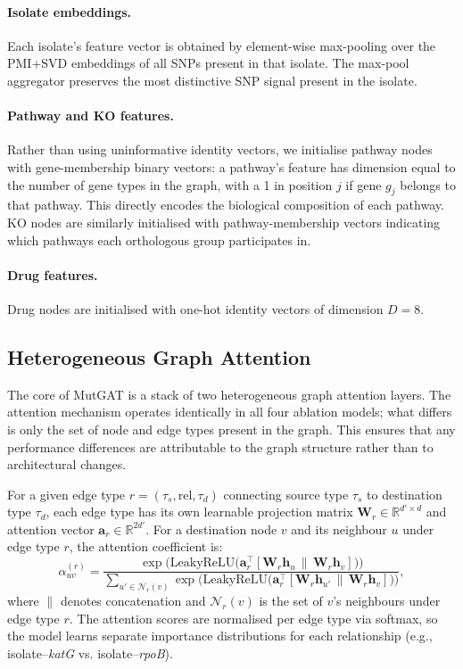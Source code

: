\documentclass{article}
\theoremstyle{plain}
\theoremstyle{definition}
\theoremstyle{remark}
\begin{document}
\paragraph{Isolate embeddings.}
Each isolate's feature vector is obtained by element-wise max-pooling over the PMI+SVD embeddings of all SNPs present in that isolate. The max-pool aggregator preserves the most distinctive SNP signal present in the isolate.

\paragraph{Pathway and KO features.}
Rather than using uninformative identity vectors, we initialise pathway nodes with gene-membership binary vectors: a pathway's feature has dimension equal to the number of gene types in the graph, with a 1 in position $j$ if gene $g_j$ belongs to that pathway. This directly encodes the biological composition of each pathway. KO nodes are similarly initialised with pathway-membership vectors indicating which pathways each orthologous group participates in.

\paragraph{Drug features.}
Drug nodes are initialised with one-hot identity vectors of dimension $D = 8$.

\subsection{Heterogeneous Graph Attention}
\label{sec:hgat}

The core of MutGAT is a stack of two heterogeneous graph attention layers. The attention mechanism operates identically in all four ablation models; what differs is only the set of node and edge types present in the graph. This ensures that any performance differences are attributable to the graph structure rather than to architectural changes.

For a given edge type $r = (\tau_s, \text{rel}, \tau_d)$ connecting source type $\tau_s$ to destination type $\tau_d$, each edge type has its own learnable projection matrix $\mathbf{W}_r \in \mathbb{R}^{d' \times d}$ and attention vector $\mathbf{a}_r \in \mathbb{R}^{2d'}$. For a destination node $v$ and its neighbour $u$ under edge type $r$, the attention coefficient is:
\begin{equation}
    \alpha_{uv}^{(r)} = \frac{
        \exp\!\bigl(\text{LeakyReLU}\!\bigl(\mathbf{a}_r^\top [\mathbf{W}_r \mathbf{h}_u \,\|\, \mathbf{W}_r \mathbf{h}_v]\bigr)\bigr)
    }{
        \sum_{u' \in \mathcal{N}_r(v)} \exp\!\bigl(\text{LeakyReLU}\!\bigl(\mathbf{a}_r^\top [\mathbf{W}_r \mathbf{h}_{u'} \,\|\, \mathbf{W}_r \mathbf{h}_v]\bigr)\bigr)
    },
\label{eq:att}
\end{equation}
where $\|$ denotes concatenation and $\mathcal{N}_r(v)$ is the set of $v$'s neighbours under edge type $r$. The attention scores are normalised per edge type via softmax, so the model learns separate importance distributions for each relationship (e.g., isolate--\textit{katG} vs. isolate--\textit{rpoB}).
\end{document}
